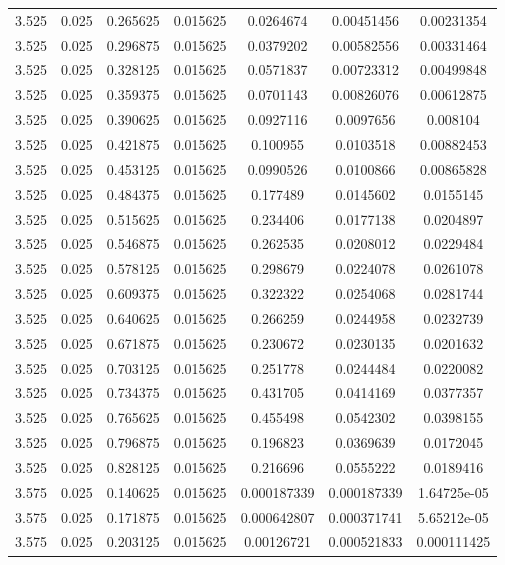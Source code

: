 \begin{table}[bh]
\begin{center}
{\begin{tabular}{ccccccc}
3.525	 & 0.025 & 	0.265625	 & 0.015625	 & 0.0264674	 & 0.00451456	 & 0.00231354 \\ 
3.525	 & 0.025 & 	0.296875	 & 0.015625	 & 0.0379202	 & 0.00582556	 & 0.00331464 \\ 
3.525	 & 0.025 & 	0.328125	 & 0.015625	 & 0.0571837	 & 0.00723312	 & 0.00499848 \\ 
3.525	 & 0.025 & 	0.359375	 & 0.015625	 & 0.0701143	 & 0.00826076	 & 0.00612875 \\ 
3.525	 & 0.025 & 	0.390625	 & 0.015625	 & 0.0927116	 & 0.0097656	 & 0.008104 \\ 
3.525	 & 0.025 & 	0.421875	 & 0.015625	 & 0.100955	 & 0.0103518	 & 0.00882453 \\ 
3.525	 & 0.025 & 	0.453125	 & 0.015625	 & 0.0990526	 & 0.0100866	 & 0.00865828 \\ 
3.525	 & 0.025 & 	0.484375	 & 0.015625	 & 0.177489	 & 0.0145602	 & 0.0155145 \\ 
3.525	 & 0.025 & 	0.515625	 & 0.015625	 & 0.234406	 & 0.0177138	 & 0.0204897 \\ 
3.525	 & 0.025 & 	0.546875	 & 0.015625	 & 0.262535	 & 0.0208012	 & 0.0229484 \\ 
3.525	 & 0.025 & 	0.578125	 & 0.015625	 & 0.298679	 & 0.0224078	 & 0.0261078 \\ 
3.525	 & 0.025 & 	0.609375	 & 0.015625	 & 0.322322	 & 0.0254068	 & 0.0281744 \\ 
3.525	 & 0.025 & 	0.640625	 & 0.015625	 & 0.266259	 & 0.0244958	 & 0.0232739 \\ 
3.525	 & 0.025 & 	0.671875	 & 0.015625	 & 0.230672	 & 0.0230135	 & 0.0201632 \\ 
3.525	 & 0.025 & 	0.703125	 & 0.015625	 & 0.251778	 & 0.0244484	 & 0.0220082 \\ 
3.525	 & 0.025 & 	0.734375	 & 0.015625	 & 0.431705	 & 0.0414169	 & 0.0377357 \\ 
3.525	 & 0.025 & 	0.765625	 & 0.015625	 & 0.455498	 & 0.0542302	 & 0.0398155 \\ 
3.525	 & 0.025 & 	0.796875	 & 0.015625	 & 0.196823	 & 0.0369639	 & 0.0172045 \\ 
3.525	 & 0.025 & 	0.828125	 & 0.015625	 & 0.216696	 & 0.0555222	 & 0.0189416 \\ 
3.575	 & 0.025 & 	0.140625	 & 0.015625	 & 0.000187339	 & 0.000187339	 & 1.64725e-05 \\ 
3.575	 & 0.025 & 	0.171875	 & 0.015625	 & 0.000642807	 & 0.000371741	 & 5.65212e-05 \\ 
3.575	 & 0.025 & 	0.203125	 & 0.015625	 & 0.00126721	 & 0.000521833	 & 0.000111425 \\ 

\end{tabular}}
\end{center}
\end{table}
